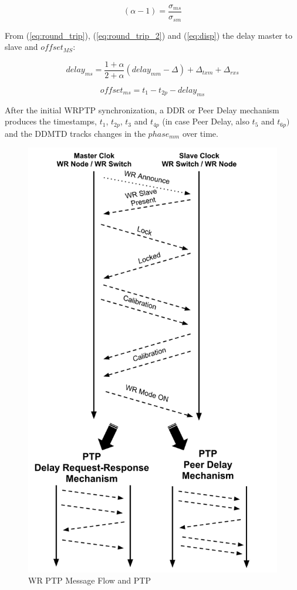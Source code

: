\begin{equation}
    \label{eq:disp}
    (\alpha-1) = \frac{\sigma_{ms}}{\sigma_{sm}}
\end{equation}

From (\ref{eq:round_trip}), (\ref{eq:round_trip_2}) and  (\ref{eq:disp}) the delay
master to slave and $offset_{MS}$:

\begin{equation}
    \label{eq:delayms}
     delay_{ms} = \frac{1+ \alpha}{2+ \alpha}(delay_{mm} - \Delta)+ \Delta_{txm} + \Delta_{rxs} 
\end{equation}

\begin{equation}
    \label{eq:offsetms}
    offset_{ms} = t_{1} - t_{2p} - delay_{ms}
\end{equation}


After the initial WRPTP synchronization, a DDR or Peer Delay mechanism produces the 
timestamps, $t_{1}$, $t_{2p}$, $t_{3}$ and $t_{4p}$ (in case Peer Delay, also
$t_{5}$ and $t_{6p})$ and the DDMTD tracks changes in the $phase_{mm}$ over time. 

\begin{figure}[!t]
\centering
\includegraphics[scale=0.25]{fig/wr_ptp.png}
\caption{WR PTP Message Flow and PTP}
\label{fig:wr_ptp}
\end{figure}


